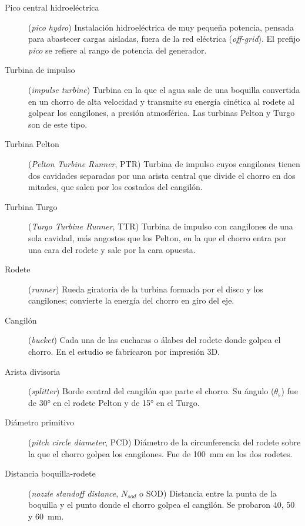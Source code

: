 \begin{description}

\item[Pico central hidroeléctrica] (\textit{pico hydro}) Instalación hidroeléctrica de muy pequeña potencia, pensada para abastecer cargas aisladas, fuera de la red eléctrica (\textit{off-grid}). El prefijo \textit{pico} se refiere al rango de potencia del generador.

\item[Turbina de impulso] (\textit{impulse turbine}) Turbina en la que el agua sale de una boquilla convertida en un chorro de alta velocidad y transmite su energía cinética al rodete al golpear los cangilones, a presión atmosférica. Las turbinas Pelton y Turgo son de este tipo.

\item[Turbina Pelton] (\textit{Pelton Turbine Runner}, PTR) Turbina de impulso cuyos cangilones tienen dos cavidades separadas por una arista central que divide el chorro en dos mitades, que salen por los costados del cangilón.

\item[Turbina Turgo] (\textit{Turgo Turbine Runner}, TTR) Turbina de impulso con cangilones de una sola cavidad, más angostos que los Pelton, en la que el chorro entra por una cara del rodete y sale por la cara opuesta.

\item[Rodete] (\textit{runner}) Rueda giratoria de la turbina formada por el disco y los cangilones; convierte la energía del chorro en giro del eje.

\item[Cangilón] (\textit{bucket}) Cada una de las cucharas o álabes del rodete donde golpea el chorro. En el estudio se fabricaron por impresión 3D.

\item[Arista divisoria] (\textit{splitter}) Borde central del cangilón que parte el chorro. Su ángulo ($\theta_s$) fue de 30° en el rodete Pelton y de 15° en el Turgo.

\item[Diámetro primitivo] (\textit{pitch circle diameter}, PCD) Diámetro de la circunferencia del rodete sobre la que el chorro golpea los cangilones. Fue de 100~mm en los dos rodetes.

\item[Distancia boquilla-rodete] (\textit{nozzle standoff distance}, $N_{sod}$ o SOD) Distancia entre la punta de la boquilla y el punto donde el chorro golpea el cangilón. Se probaron 40, 50 y 60~mm.


\end{description}
